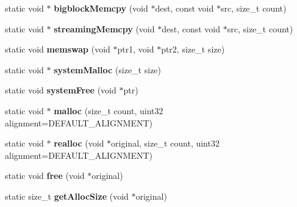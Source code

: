\begin{DoxyCompactItemize}
\item 
\mbox{\label{class_arcana_1_1_memory_a1cd99f9cd97ff110c5fa9aacaf4eded6}} 
static void $\ast$ {\bfseries bigblock\+Memcpy} (void $\ast$dest, const void $\ast$src, size\+\_\+t count)
\item 
\mbox{\label{class_arcana_1_1_memory_ac3bf58e7eb9702b5b9706e1bde1ecaf1}} 
static void $\ast$ {\bfseries streaming\+Memcpy} (void $\ast$dest, const void $\ast$src, size\+\_\+t count)
\item 
\mbox{\label{class_arcana_1_1_memory_abc0042b4b6f8f2680b28df7715c64a34}} 
static void {\bfseries memswap} (void $\ast$ptr1, void $\ast$ptr2, size\+\_\+t size)
\item 
\mbox{\label{class_arcana_1_1_memory_a1f71ef6a571f0812fa159eed696f2bd3}} 
static void $\ast$ {\bfseries system\+Malloc} (size\+\_\+t size)
\item 
\mbox{\label{class_arcana_1_1_memory_aa08e74fbd0f7ffc1554819605a945113}} 
static void {\bfseries system\+Free} (void $\ast$ptr)
\item 
\mbox{\label{class_arcana_1_1_memory_a320eb10834e1d1b45af0bf7c75931c28}} 
static void $\ast$ {\bfseries malloc} (size\+\_\+t count, uint32 alignment=D\+E\+F\+A\+U\+L\+T\+\_\+\+A\+L\+I\+G\+N\+M\+E\+NT)
\item 
\mbox{\label{class_arcana_1_1_memory_a55e4cfcfb71508be2fab37efb5d4b720}} 
static void $\ast$ {\bfseries realloc} (void $\ast$original, size\+\_\+t count, uint32 alignment=D\+E\+F\+A\+U\+L\+T\+\_\+\+A\+L\+I\+G\+N\+M\+E\+NT)
\item 
\mbox{\label{class_arcana_1_1_memory_a4cf60312bc57041b3423a693c7258f42}} 
static void {\bfseries free} (void $\ast$original)
\item 
\mbox{\label{class_arcana_1_1_memory_a449fecd7c0eabe7d1f02135c6c2e86e1}} 
static size\+\_\+t {\bfseries get\+Alloc\+Size} (void $\ast$original)
\item 
\mbox{\label{class_arcana_1_1_memory_af433a0e9faeb7db992445709016118c3}} 

\end{DoxyCompactItemize}
